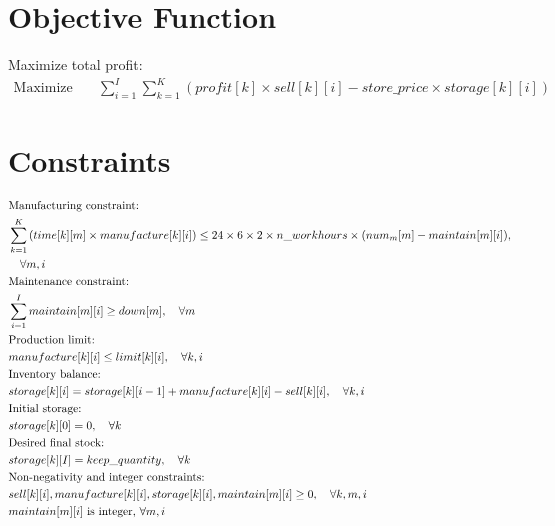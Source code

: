 \documentclass{article}
\begin{document}
\section*{Objective Function}
Maximize total profit:
\begin{align}
    \text{Maximize} \quad & \sum_{i=1}^{I} \sum_{k=1}^{K} \left( profit[k] \times sell[k][i] - store\_price \times storage[k][i] \right)
\end{align}

\section*{Constraints}
\begin{align}
    & \text{Manufacturing constraint:} \notag \\
    & \sum_{k=1}^{K} \left( time[k][m] \times manufacture[k][i] \right) \leq 24 \times 6 \times 2 \times n\_workhours \times (num_m[m] - maintain[m][i]), \notag \\
    & \quad \forall m, i \\
    & \text{Maintenance constraint:} \notag \\
    & \sum_{i=1}^{I} maintain[m][i] \geq down[m], \quad \forall m \\
    & \text{Production limit:} \notag \\
    & manufacture[k][i] \leq limit[k][i], \quad \forall k, i \\
    & \text{Inventory balance:} \notag \\
    & storage[k][i] = storage[k][i-1] + manufacture[k][i] - sell[k][i], \quad \forall k, i \\
    & \text{Initial storage:} \notag \\
    & storage[k][0] = 0, \quad \forall k \\
    & \text{Desired final stock:} \notag \\
    & storage[k][I] = keep\_quantity, \quad \forall k \\
    & \text{Non-negativity and integer constraints:} \notag \\
    & sell[k][i], manufacture[k][i], storage[k][i], maintain[m][i] \geq 0, \quad \forall k, m, i \\
    & maintain[m][i] \text{ is integer, } \forall m, i
\end{align}
\end{document}
